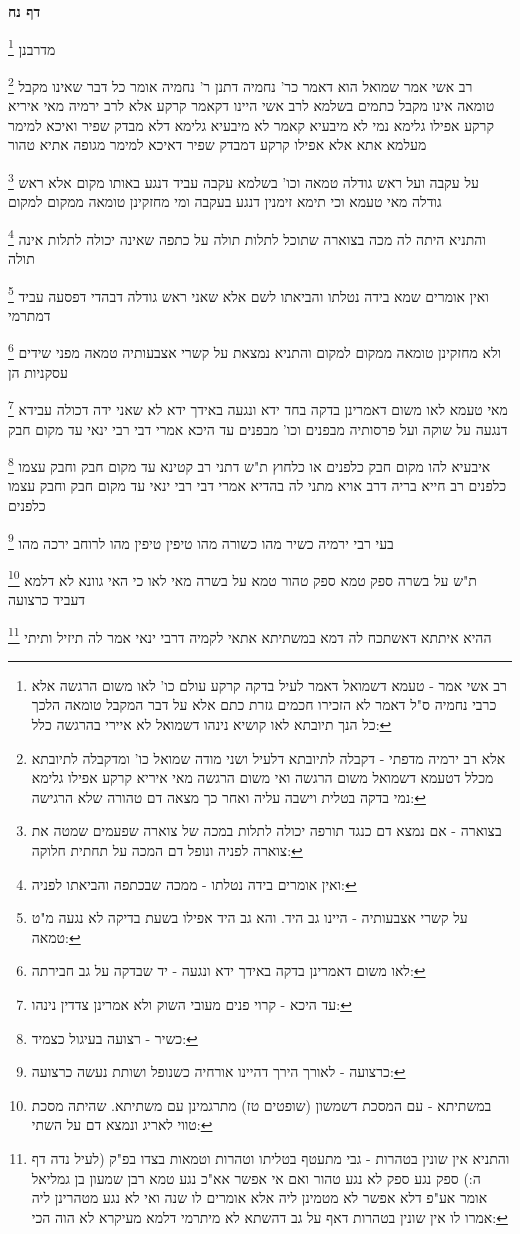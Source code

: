 \documentclass[12pt, openany]{book}
\newcommand{\sethebfont}{
\fontsize{10.5pt}{21.0pt} \selectfont
}
\newcommand{\twocol}[1]{
	{\sethebfont \begin{multicols}{2}
			#1
	\end{multicols}}	
}
\newcommand{\sectname}{}
\newcommand{\newsection}[1]{
	\renewcommand{\sectname}{#1}	
	\vspace{-\baselineskip}
	\begin{center}
		\textbf{%
\fontsize{16pt}{16pt}\selectfont
			#1}
	\end{center}
	\vspace{-\baselineskip}
	\nopagebreak
}
\newcommand{\footnotecomment}[1]{
	\renewcommand\thefootnote{}
	\footnote{#1}}
\newcommand{\commenta}[1]{\footnotecomment{#1}}
\begin{document}
{\newsection{דף נח}
\twocol{
\commenta{רב אשי אמר - טעמא דשמואל דאמר לעיל בדקה קרקע עולם כו' לאו משום הרגשה אלא כרבי נחמיה ס"ל דאמר לא הזכירו חכמים גזרת כתם אלא על דבר המקבל טומאה הלכך כל הנך תיובתא לאו קושיא נינהו דשמואל לא איירי בהרגשה כלל:}
מדרבנן 
\commenta{אלא רב ירמיה מדפתי - דקבלה לתיובתא דלעיל ושני מודה שמואל כו' ומדקבלה לתיובתא מכלל דטעמא דשמואל משום הרגשה ואי משום הרגשה מאי איריא קרקע אפילו גלימא נמי בדקה בטלית וישבה עליה ואחר כך מצאה דם טהורה שלא הרגישה:}
רב אשי אמר שמואל הוא דאמר כר' נחמיה דתנן ר' נחמיה אומר כל דבר שאינו מקבל טומאה אינו מקבל כתמים 
בשלמא לרב אשי היינו דקאמר קרקע אלא לרב ירמיה מאי איריא קרקע אפילו גלימא נמי לא מיבעיא קאמר
לא מיבעיא גלימא דלא מבדק שפיר ואיכא למימר מעלמא אתא אלא אפילו קרקע דמבדק שפיר דאיכא למימר מגופה אתיא טהור
\commenta{בצוארה - אם נמצא דם כנגד תורפה יכולה לתלות במכה של צוארה שפעמים שמטה את צוארה לפניה ונופל דם המכה על תחתית חלוקה:}
על עקבה ועל ראש גודלה טמאה וכו' בשלמא עקבה עביד דנגע באותו מקום אלא ראש גודלה מאי טעמא וכי תימא זימנין דנגע בעקבה ומי מחזקינן טומאה ממקום למקום 
\commenta{ואין אומרים בידה נטלתו - ממכה שבכתפה והביאתו לפניה:}
והתניא היתה לה מכה בצוארה שתוכל לתלות תולה על כתפה שאינה יכולה לתלות אינה תולה
\commenta{על קשרי אצבעותיה - היינו גב היד. והא גב היד אפילו בשעת בדיקה לא נגעה מ"ט טמאה:}
ואין אומרים שמא בידה נטלתו והביאתו לשם אלא שאני ראש גודלה דבהדי דפסעה עביד דמתרמי 
\commenta{לאו משום דאמרינן בדקה באידך ידא ונגעה - יד שבדקה על גב חבירתה:}
ולא מחזקינן טומאה ממקום למקום והתניא נמצאת על קשרי אצבעותיה טמאה מפני שידים עסקניות הן 
\commenta{עד היכא - קרוי פנים מעובי השוק ולא אמרינן צדדין נינהו:}
מאי טעמא לאו משום דאמרינן בדקה בחד ידא ונגעה באידך ידא לא שאני ידה דכולה עבידא דנגעה
על שוקה ועל פרסותיה מבפנים וכו' מבפנים עד היכא אמרי דבי רבי ינאי עד מקום חבק 
\commenta{כשיר - רצועה בעיגול כצמיד:}
איבעיא להו מקום חבק כלפנים או כלחוץ ת"ש דתני רב קטינא עד מקום חבק וחבק עצמו כלפנים רב חייא בריה דרב אויא מתני לה בהדיא אמרי דבי רבי ינאי עד מקום חבק וחבק עצמו כלפנים 
\commenta{כרצועה - לאורך הירך דהיינו אורחיה כשנופל ושותת נעשה כרצועה:}
בעי רבי ירמיה כשיר מהו כשורה מהו טיפין טיפין מהו לרוחב ירכה מהו 
\commenta{במשתיתא - עם המסכת דשמשון (שופטים טז) מתרגמינן עם משתיתא. שהיתה מסכת טווי לאריג ונמצא דם על השתי:}
ת"ש על בשרה ספק טמא ספק טהור טמא על בשרה מאי לאו כי האי גוונא לא דלמא דעביד כרצועה 
\commenta{והתניא אין שונין בטהרות - גבי מתעטף בטליתו וטהרות וטמאות בצדו בפ"ק (לעיל נדה דף ה:) ספק נגע ספק לא נגע טהור ואם אי אפשר אא"כ נגע טמא רבן שמעון בן גמליאל אומר אע"פ דלא אפשר לא מטמינן ליה אלא אומרים לו שנה ואי לא נגע מטהרינן ליה אמרו לו אין שונין בטהרות דאף על גב דהשתא לא מיתרמי דלמא מעיקרא לא הוה הכי:
}
ההיא איתתא דאשתכח לה דמא במשתיתא אתאי לקמיה דרבי ינאי אמר לה תיזיל ותיתי 
}}
\end{document}
